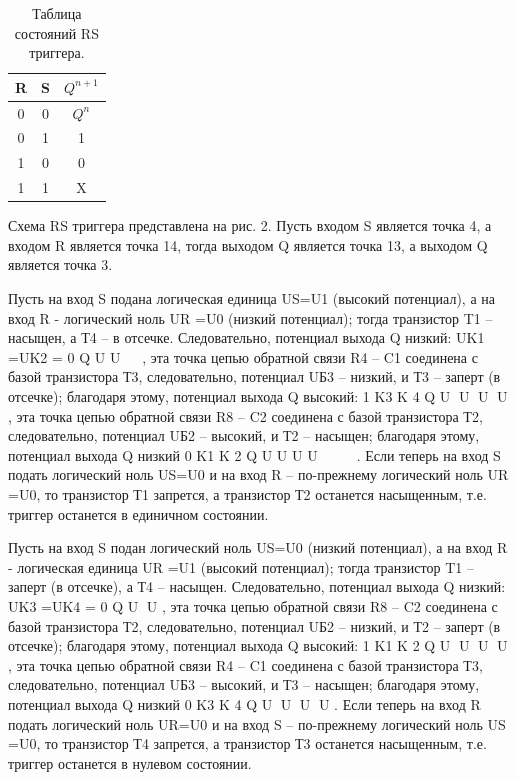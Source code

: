 \documentclass[a4paper,14pt]{article}
\begin{document}
\begin{table}[H]
	\centering
	\caption{Таблица состояний RS триггера.}
	\begin{tabular}{|c|c|c|}
		\hline
		R & S & $Q^{n+1}$  \\ \hline
		0 & 0 & $Q^n$  \\ \hline
		0 & 1 & 1 \\ \hline
		1 & 0 & 0 \\ \hline
		1 & 1 & X \\ \hline
	\end{tabular}
\end{table}

Схема RS триггера представлена на рис. 2. Пусть входом S является точка 4, а входом
R является точка 14, тогда выходом Q является точка 13, а выходом Q является точка 3.

Пусть на вход S подана логическая единица US=U1 (высокий потенциал), а на вход R -
логический ноль UR =U0 (низкий потенциал); тогда транзистор T1 – насыщен, а Т4 – в
отсечке. Следовательно, потенциал выхода Q низкий: UK1 =UK2 = 0
Q
U U   , эта точка цепью
обратной связи R4 – C1 соединена с базой транзистора Т3, следовательно, потенциал UБ3 –
низкий, и Т3 – заперт (в отсечке); благодаря этому, потенциал выхода Q высокий:
1
K3 K 4 Q U U U U , эта точка цепью обратной связи R8 – C2 соединена с базой транзистора
Т2, следовательно, потенциал UБ2 – высокий, и Т2 – насыщен; благодаря этому, потенциал
выхода Q низкий 0
K1 K 2
Q
U U U U     . Если теперь на вход S подать логический ноль US=U0
и на вход R – по-прежнему логический ноль UR =U0, то транзистор Т1 запрется, а транзистор
Т2 останется насыщенным, т.е. триггер останется в единичном состоянии.

Пусть на вход S подан логический ноль US=U0 (низкий потенциал), а на вход R -
логическая единица UR =U1 (высокий потенциал); тогда транзистор T1 – заперт (в отсечке), а
Т4 – насыщен. Следовательно, потенциал выхода Q низкий: UK3 =UK4 = 0
Q U U , эта точка
цепью обратной связи R8 – C2 соединена с базой транзистора Т2, следовательно, потенциал
UБ2 – низкий, и Т2 – заперт (в отсечке); благодаря этому, потенциал выхода Q высокий:
1
K1 K 2 Q U U U U , эта точка цепью обратной связи R4 – C1 соединена с базой транзистора
Т3, следовательно, потенциал UБ3 – высокий, и Т3 – насыщен; благодаря этому, потенциал
выхода Q низкий 0
K3 K 4 Q U U U U . Если теперь на вход R подать логический ноль
UR=U0 и на вход S – по-прежнему логический ноль US =U0, то транзистор Т4 запрется, а
транзистор Т3 останется насыщенным, т.е. триггер останется в нулевом состоянии.
\end{document}

